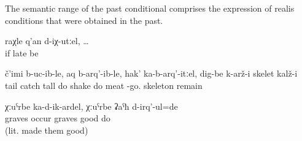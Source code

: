 The semantic range of the past conditional comprises the expression of realis conditions that were obtained in the past.
%
\begin{exe}
	\ex	\label{ex:If we were too late}
	\gll	raχle	q'an	d-iχ-utːel, \ldots\\
		if	late	be\\
	\glt	{}

	\ex	\label{ex:If you hold the tail (of the fish) and lift it up and shake it}
	\gll	č'imi	b-uc-ib-le,	aq	b-arq'-ib-le,	hak'	ka-b-arq'-itːel,	dig-be	k-arž-i	skelet	kalž-i\\
		tail	catch	tall	do shake	do	meat	-go.	skeleton	remain\\
	\glt	{}

	\ex	\label{ex:When/if graves fell down, (grandfather) put them up again}
	\gll	χːuˁrbe	ka-d-ik-ardel, 	χːuˁrbe	ʡaˁħ	d-irq'-ul=de\\
		graves	occur graves	good	do\\
	\glt	{} (lit. made them good)
\end{exe}

